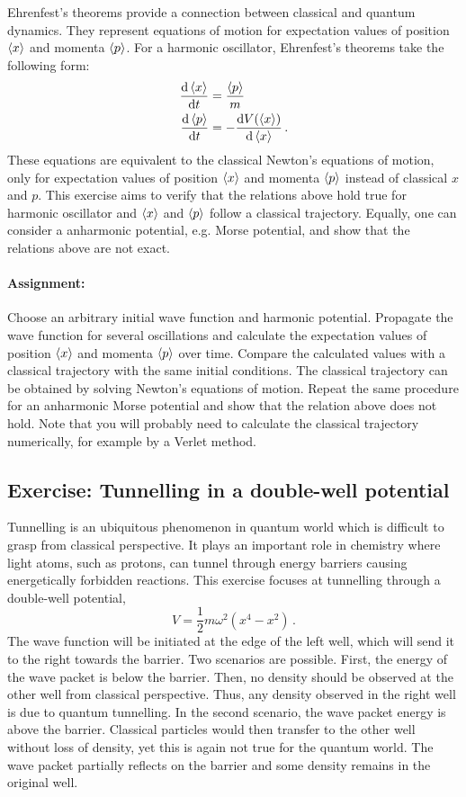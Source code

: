 Ehrenfest's theorems provide a connection between classical and quantum dynamics. They represent equations of motion for expectation values of position $\braket{x}$ and momenta $\braket{p}$. For a harmonic oscillator, Ehrenfest's theorems take the following form:
\begin{align*}
    \frac{\mathop{}\!\mathrm{d} \braket{x}}{\mathop{}\!\mathrm{d} t} &= \frac{\braket{p}}{m} \\
    \frac{\mathop{}\!\mathrm{d} \braket{p}}{\mathop{}\!\mathrm{d} t} &= -\frac{\mathop{}\!\mathrm{d} V(\braket{x})}{\mathop{}\!\mathrm{d} \braket{x}} \, .
\end{align*}
These equations are equivalent to the classical Newton's equations of motion, only for expectation values of position $\braket{x}$ and momenta $\braket{p}$ instead of classical $x$ and $p$. This exercise aims to verify that the relations above hold true for harmonic oscillator and $\braket{x}$ and $\braket{p}$ follow a classical trajectory. Equally, one can consider a anharmonic potential, e.g. Morse potential, and show that the relations above are not exact.

\paragraph{Assignment:} Choose an arbitrary initial wave function and harmonic potential. Propagate the wave function for several oscillations and calculate the expectation values of position $\braket{x}$ and momenta $\braket{p}$ over time. Compare the calculated values with a classical trajectory with the same initial conditions. The classical trajectory can be obtained by solving Newton's equations of motion. Repeat the same procedure for an anharmonic Morse potential and show that the relation above does not hold. Note that you will probably need to calculate the classical trajectory numerically, for example by a Verlet method.


\subsection*{Exercise: Tunnelling in a double-well potential}

Tunnelling is an ubiquitous phenomenon in quantum world which is difficult to grasp from classical perspective. It plays an important role in chemistry where light atoms, such as protons, can tunnel through energy barriers causing energetically forbidden reactions. This exercise focuses at tunnelling through a double-well potential,
\begin{equation*}
    V = \frac{1}{2}m\omega^2(x^4 - x^2) \, .
\end{equation*}
The wave function will be initiated at the edge of the left well, which will send it to the right towards the barrier. Two scenarios are possible. First, the energy of the wave packet is below the barrier. Then, no density should be observed at the other well from classical perspective. Thus, any density observed in the right well is due to quantum tunnelling. In the second scenario, the wave packet energy is above the barrier. Classical particles would then transfer to the other well without loss of density, yet this is again not true for the quantum world. The wave packet partially reflects on the barrier and some density remains in the original well.

